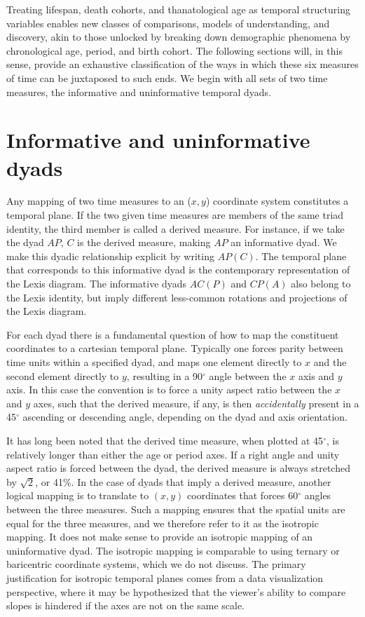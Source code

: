 \documentclass[12pt,oneside,letter]{article} %
\begin{document}
Treating lifespan,
death cohorts, and thanatological age as temporal structuring variables
enables new classes of comparisons, models of understanding, and discovery,
akin to those unlocked by breaking down demographic phenomena by chronological age,
period, and birth cohort. The following sections will, in this sense, provide an
exhaustive classification of the ways in which these six measures of time can be juxtaposed to such ends.
We begin with all sets of two time measures, the informative and uninformative
temporal dyads.

\FloatBarrier

\section*{Informative and uninformative dyads}

Any mapping of two time measures to an ($x,y$) coordinate
system constitutes a temporal plane. If the two given time measures are members of the same triad identity, the third member is called a derived
measure. For instance, if we take the dyad $AP$, $C$ is the derived
measure, making $AP$ an informative dyad. We make this dyadic relationship
explicit by writing $AP(C)$.
The temporal plane that corresponds to this informative dyad is the contemporary representation of the
Lexis diagram. The informative dyads $AC(P)$ and $CP(A)$ also belong to the Lexis identity, but imply different less-common rotations and projections of the Lexis
diagram. 

For each dyad there is a fundamental question of how to map the constituent
coordinates to a cartesian temporal plane. Typically one forces parity between time units within
a specified dyad, and maps one element directly to $x$ and the second element
directly to $y$, resulting in a 90$^\circ$ angle between the $x$ axis and $y$
axis. In this case the convention is to force a unity aspect ratio
between the $x$ and $y$ axes, such that the derived measure, if any, is then
\textit{accidentally} present in a 45$^\circ$ ascending or descending angle,
depending on the dyad and axis orientation. 

It has long been noted \citep{zeuner1869abhandlungen, perozzo1880della} that the
derived time measure, when plotted at 45$^\circ$, is relatively
longer than either the age or period axes. If a right angle and unity aspect
ratio is forced between the dyad, the derived measure is always stretched by
$\sqrt{2}$, or 41\%. In the case of dyads that imply a derived measure, another
logical mapping is to translate to $(x,y)$ coordinates that forces 60$^\circ$
angles between the three measures. Such a mapping ensures that the spatial units are equal for the three measures, and we therefore refer to it as the isotropic mapping. It does not make sense to provide an isotropic mapping of an uninformative dyad. The isotropic mapping
is comparable to using ternary or baricentric coordinate systems, which we do not discuss. The primary justification for isotropic temporal planes comes from a data visualization perspective, where it may be hypothesized that the viewer's ability to compare slopes is hindered if the axes are not on the same scale.
\end{document}
